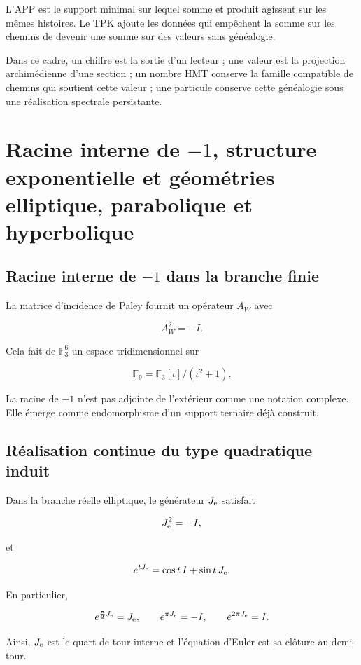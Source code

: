 L’APP est le support minimal sur lequel somme et produit agissent sur les mêmes histoires. Le TPK ajoute les données qui empêchent la somme sur les chemins de devenir une somme sur des valeurs sans généalogie.

Dans ce cadre, un chiffre est la sortie d’un lecteur ; une valeur est la projection archimédienne d’une section ; un nombre HMT conserve la famille compatible de chemins qui soutient cette valeur ; une particule conserve cette généalogie sous une réalisation spectrale persistante.


\section{Racine interne de \(-1\), structure exponentielle et géométries elliptique, parabolique et hyperbolique}

\subsection{Racine interne de \(-1\) dans la branche finie}

La matrice d’incidence de Paley fournit un opérateur \(A_W\) avec

\[
A_W^2=-I.
\]

Cela fait de \(\mathbb F_3^6\) un espace tridimensionnel sur

\[
\mathbb F_9=\mathbb F_3[\iota]/(\iota^2+1).
\]

La racine de \(-1\) n’est pas adjointe de l’extérieur comme une notation complexe. Elle émerge comme endomorphisme d’un support ternaire déjà construit.

\subsection{Réalisation continue du type quadratique induit}

Dans la branche réelle elliptique, le générateur \(J_{\rm e}\) satisfait

\[
J_{\rm e}^2=-I,
\]

et

\[
e^{tJ_{\rm e}}=\cos t\,I+\sin t\,J_{\rm e}.
\]

En particulier,

\[
e^{\frac\pi2J_{\rm e}}=J_{\rm e},\qquad
e^{\pi J_{\rm e}}=-I,\qquad
e^{2\pi J_{\rm e}}=I.
\]

Ainsi, \(J_{\rm e}\) est le quart de tour interne et l’équation d’Euler est sa clôture au demi-tour.


